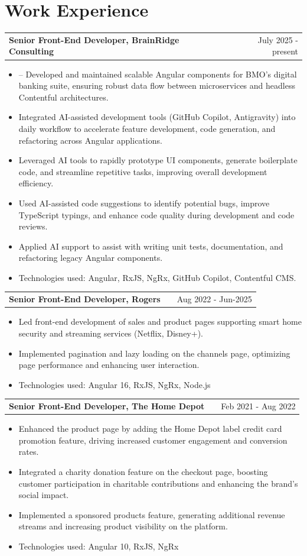 \documentclass[a4paper,12pt]{article}
\makeatletter
\newenvironment{joblong}[2]
    {
    \begin{tabularx}{\linewidth}{@{}l X r@{}}
    \textbf{#1} & \hfill &  #2 \\[3.75pt]
    \end{tabularx}
    \begin{minipage}[t]{\linewidth}
    \begin{itemize}[nosep,after=\strut, leftmargin=1em, itemsep=3pt,label=--]
    }
    {
    \end{itemize}
    \end{minipage}    
    }
\makeatother
\begin{document}
\section{Work Experience}

\begin{joblong}{Senior Front-End Developer, BrainRidge Consulting}{July 2025 - present}
\item – Developed and maintained scalable Angular components for BMO’s digital banking suite, ensuring robust data flow between microservices and headless Contentful architectures.
\item Integrated AI-assisted development tools (GitHub Copilot, Antigravity) into daily workflow to accelerate feature development, code generation, and refactoring across Angular applications.
\item Leveraged AI tools to rapidly prototype UI components, generate boilerplate code, and streamline repetitive tasks, improving overall development efficiency.
\item Used AI-assisted code suggestions to identify potential bugs, improve TypeScript typings, and enhance code quality during development and code reviews.
\item Applied AI support to assist with writing unit tests, documentation, and refactoring legacy Angular components.
\item Technologies used:  Angular, RxJS, NgRx, GitHub Copilot, Contentful CMS.
\end{joblong}

\begin{joblong}{Senior Front-End Developer, Rogers}{Aug 2022 - Jun-2025}
\item Led front-end development of sales and product pages supporting smart home security and streaming services (Netflix, Disney+).
\item Implemented pagination and lazy loading on the channels page, optimizing page performance and enhancing user interaction.
\item Technologies used:  Angular 16, RxJS, NgRx, Node.js
\end{joblong}

\begin{joblong}{Senior Front-End Developer, The Home Depot}{Feb 2021 - Aug 2022}
\item Enhanced the product page by adding the Home Depot label credit card promotion feature, driving increased customer engagement and conversion rates.
\item Integrated a charity donation feature on the checkout page, boosting customer participation in charitable contributions and enhancing the brand's social impact. 
\item Implemented a sponsored products feature, generating additional revenue streams and increasing product visibility on the platform.
\item Technologies used:  Angular 10, RxJS, NgRx
\end{joblong}
\end{document}
